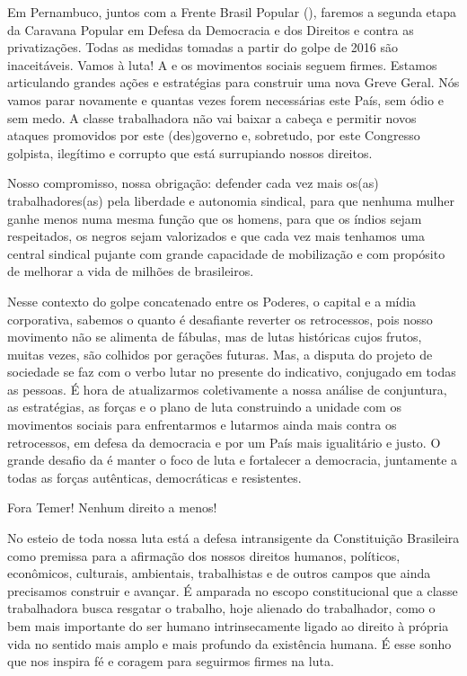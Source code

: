 Em Pernambuco, juntos com a Frente Brasil Popular (), faremos a segunda etapa da Caravana Popular em Defesa da Democracia e dos Direitos e contra as privatizações. Todas as medidas tomadas a partir do golpe de 2016 são inaceitáveis. Vamos à luta! A  e os movimentos sociais seguem firmes. Estamos articulando grandes ações e estratégias para construir uma nova Greve Geral. Nós vamos parar novamente e quantas vezes forem necessárias este País, sem ódio e sem medo. A classe trabalhadora não vai baixar a cabeça e permitir novos ataques promovidos por este (des)governo e, sobretudo, por este Congresso golpista, ilegítimo e corrupto que está surrupiando nossos direitos. 

Nosso compromisso, nossa obrigação: defender cada vez mais os(as) trabalhadores(as) pela liberdade e autonomia sindical, para que nenhuma mulher ganhe menos numa mesma função que os homens, para que os índios sejam respeitados, os negros sejam valorizados e que cada vez mais tenhamos uma central sindical pujante com grande capacidade de mobilização e com propósito de melhorar a vida de milhões de brasileiros. 

Nesse contexto do golpe concatenado entre os Poderes, o capital e a mídia corporativa, sabemos o quanto é desafiante reverter os retrocessos, pois nosso movimento não se alimenta de fábulas, mas de lutas históricas cujos frutos, muitas vezes, são colhidos por gerações futuras. Mas, a disputa do projeto de sociedade se faz com o verbo lutar no presente do indicativo, conjugado em todas as pessoas. É hora de atualizarmos coletivamente a nossa análise de conjuntura, as estratégias, as forças e o plano de luta construindo a unidade com os movimentos sociais para enfrentarmos e lutarmos ainda mais contra os retrocessos, em defesa da democracia e por um País mais igualitário e justo. O grande desafio da  é manter o foco de luta e fortalecer a democracia, juntamente a todas as forças autênticas, democráticas e resistentes. 

Fora Temer! Nenhum direito a menos! 

No esteio de toda nossa luta está a defesa intransigente da Constituição Brasileira como premissa para a afirmação dos nossos direitos humanos, políticos, econômicos, culturais, ambientais, trabalhistas e de outros campos que ainda precisamos construir e avançar. É amparada no escopo constitucional que a classe trabalhadora busca resgatar o trabalho, hoje alienado do trabalhador, como o bem mais importante do ser humano intrinsecamente ligado ao direito à própria vida no sentido mais amplo e mais profundo da existência humana. É esse sonho que nos inspira fé e coragem para seguirmos firmes na luta. 

